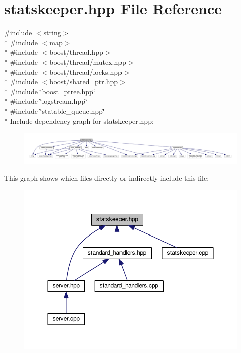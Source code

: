 \hypertarget{a00082}{\section{statskeeper.\-hpp File Reference}
\label{a00082}
}
{\ttfamily \#include $<$string$>$}\\*
{\ttfamily \#include $<$map$>$}\\*
{\ttfamily \#include $<$boost/thread.\-hpp$>$}\\*
{\ttfamily \#include $<$boost/thread/mutex.\-hpp$>$}\\*
{\ttfamily \#include $<$boost/thread/locks.\-hpp$>$}\\*
{\ttfamily \#include $<$boost/shared\-\_\-ptr.\-hpp$>$}\\*
{\ttfamily \#include \char`\"{}boost\-\_\-ptree.\-hpp\char`\"{}}\\*
{\ttfamily \#include \char`\"{}logstream.\-hpp\char`\"{}}\\*
{\ttfamily \#include \char`\"{}statable\-\_\-queue.\-hpp\char`\"{}}\\*
Include dependency graph for statskeeper.\-hpp\-:\nopagebreak
\begin{figure}[H]
\begin{center}
\leavevmode
\includegraphics[width=350pt]{a00131}
\end{center}
\end{figure}
This graph shows which files directly or indirectly include this file\-:\nopagebreak
\begin{figure}[H]
\begin{center}
\leavevmode
\includegraphics[width=350pt]{a00132}
\end{center}
\end{figure}
